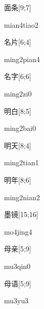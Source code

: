 \begin{verbete}{面条}[9;7]
\begin{pronuncia}{mian4tiao2}
\end{pronuncia}
\end{verbete}

\begin{verbete}{名片}[6;4]
\begin{pronuncia}{ming2pian4}
\end{pronuncia}
\end{verbete}

\begin{verbete}[ming2zi0]{名字}[6;6]
\begin{pronuncia}{ming2zi0}
\end{pronuncia}
\end{verbete}

\begin{verbete}{明白}[8;5]
\begin{pronuncia}{ming2bai0}
\end{pronuncia}
\end{verbete}

\begin{verbete}{明天}[8;4]
\begin{pronuncia}{ming2tian1}
\end{pronuncia}
\end{verbete}

\begin{verbete}{明年}[8;6]
\begin{pronuncia}{ming2nian2}
\end{pronuncia}
\end{verbete}

\begin{verbete}[mo4jing4]{墨镜}[15;16]
\begin{pronuncia}{mo4jing4}
\end{pronuncia}
\end{verbete}

\begin{verbete}[mu3qin0]{母亲}[5;9]
\begin{pronuncia}{mu3qin0}
\end{pronuncia}
\end{verbete}                                                                     

\begin{verbete}[mu3yu3]{母语}[5;9]
\begin{pronuncia}{mu3yu3}
\end{pronuncia}
\end{verbete}                                                                     

